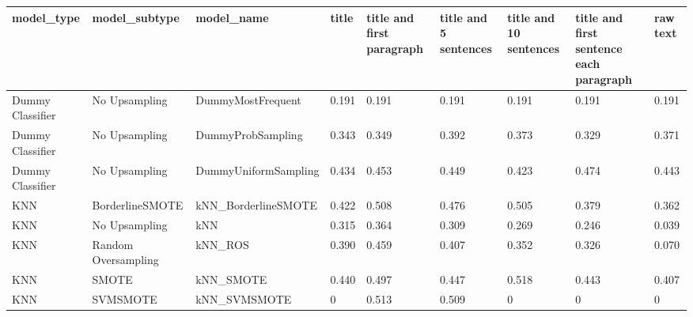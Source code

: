 \begin{tabular}{lllllllll}
\toprule
                  model\_type &       model\_subtype &                                   model\_name & title & title and first paragraph & title and 5 sentences & title and 10 sentences & title and first sentence each paragraph &  raw text \\
\midrule
            Dummy Classifier &       No Upsampling &                            DummyMostFrequent & 0.191 &                     0.191 &                 0.191 &                  0.191 &                                   0.191 &     0.191 \\
            Dummy Classifier &       No Upsampling &                            DummyProbSampling & 0.343 &                     0.349 &                 0.392 &                  0.373 &                                   0.329 &     0.371 \\
            Dummy Classifier &       No Upsampling &                         DummyUniformSampling & 0.434 &                     0.453 &                 0.449 &                  0.423 &                                   0.474 &     0.443 \\
                         KNN &     BorderlineSMOTE &                          kNN\_BorderlineSMOTE & 0.422 &                     0.508 &                 0.476 &                  0.505 &                                   0.379 &     0.362 \\
                         KNN &       No Upsampling &                                          kNN & 0.315 &                     0.364 &                 0.309 &                  0.269 &                                   0.246 &     0.039 \\
                         KNN & Random Oversampling &                                      kNN\_ROS & 0.390 &                     0.459 &                 0.407 &                  0.352 &                                   0.326 &     0.070 \\
                         KNN &               SMOTE &                                    kNN\_SMOTE & 0.440 &                     0.497 &                 0.447 &                  0.518 &                                   0.443 &     0.407 \\
                         KNN &            SVMSMOTE &                                 kNN\_SVMSMOTE &     0 &                     0.513 &                 0.509 &                      0 &                                       0 &         0 \\

\end{tabular}

